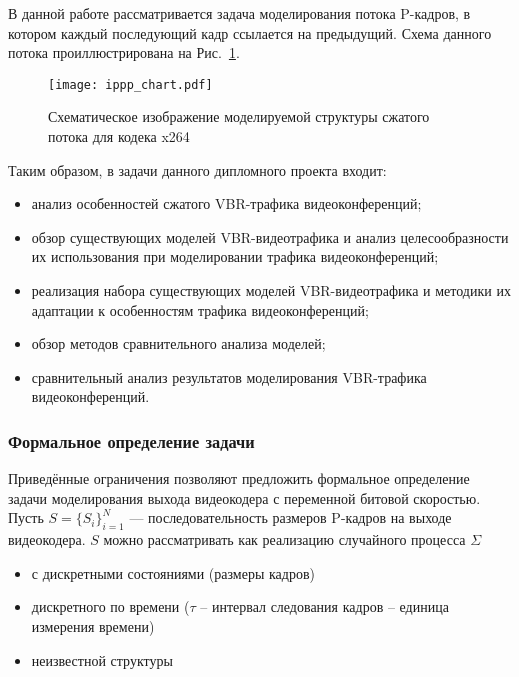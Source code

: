В данной работе рассматривается задача моделирования потока
P-кадров, в котором каждый последующий кадр ссылается на
предыдущий. Схема данного потока проиллюстрирована на Рис.~\ref{fig:ippp_frames}.

\begin{figure}[h]
    \begin{center}
        \texttt{[image: ippp\_chart.pdf]}
    \end{center}
    \caption{Схематическое изображение моделируемой структуры сжатого потока
    для кодека x264}
    \label{fig:ippp_frames}
\end{figure}

Таким образом, в задачи данного дипломного проекта входит:

\begin{itemize}
    \item анализ особенностей сжатого VBR-трафика видеоконференций;
    \item обзор существующих моделей VBR-видеотрафика и анализ
        целесообразности их использования при моделировании
        трафика видеоконференций;
    \item реализация набора существующих моделей VBR-видеотрафика
        и методики их адаптации к особенностям трафика видеоконференций;
    \item обзор методов сравнительного анализа моделей;
    \item сравнительный анализ результатов моделирования VBR-трафика
        видеоконференций.
\end{itemize}

\subsubsection{Формальное определение задачи}
\label{sse:task}
\hspace{3pt}

Приведённые ограничения позволяют предложить формальное определение задачи
моделирования выхода видеокодера с переменной битовой скоростью.
Пусть $S = \{S_i\} _{i=1}^N$ --- последовательность размеров P-кадров на выходе видеокодера.
$S$ можно рассматривать как реализацию случайного процесса $\Sigma$~\cite{randomprocesses}
\begin{itemize}
    \item с дискретными состояниями (размеры кадров)
    \item дискретного по времени ($\tau$ -- интервал следования кадров -- единица измерения времени)
    \item неизвестной структуры
\end{itemize}

